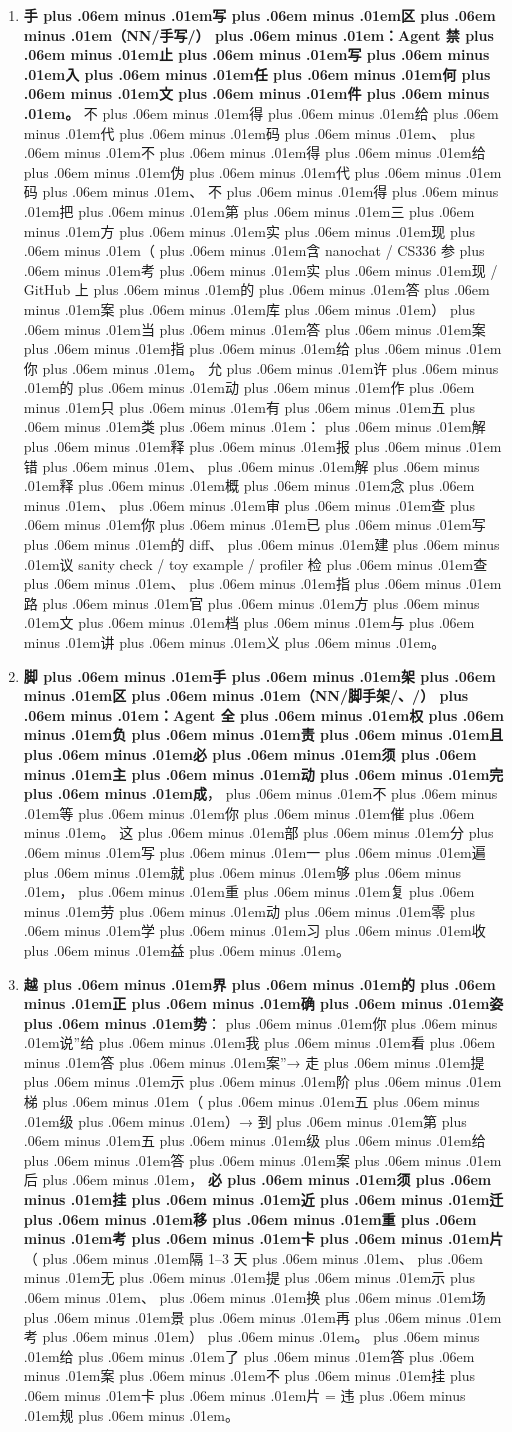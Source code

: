 \documentclass[
]{article}
\newcommand{\passthrough}[1]{#1}
\providecommand{\tightlist}{%
  \setlength{\itemsep}{0pt}\setlength{\parskip}{0pt}}
\def\zh#1{{\zhfont #1}}
\def\sym#1{{\symfont #1}}
\def\codezh#1{{\zhmonofont #1}}
\def\zhglue{\hskip0pt plus .06em minus .01em}
\begin{document}
\begin{enumerate}
\def\labelenumi{\arabic{enumi}.}
\tightlist
\item
  \textbf{\zh{手\zhglue 写\zhglue 区\zhglue （}\passthrough{\codezh{{\zh{课}}{\zh{题}}NN/{\zh{手}}{\zh{写}}/}}\zh{）\zhglue ：}Agent \zh{禁\zhglue 止\zhglue 写\zhglue 入\zhglue 任\zhglue 何\zhglue 文\zhglue 件\zhglue 。}} \zh{不\zhglue 得\zhglue 给\zhglue 代\zhglue 码\zhglue 、\zhglue 不\zhglue 得\zhglue 给\zhglue 伪\zhglue 代\zhglue 码\zhglue 、} \zh{不\zhglue 得\zhglue 把\zhglue 第\zhglue 三\zhglue 方\zhglue 实\zhglue 现\zhglue （\zhglue 含} nanochat / CS336 \zh{参\zhglue 考\zhglue 实\zhglue 现} / GitHub \zh{上\zhglue 的\zhglue 答\zhglue 案\zhglue 库\zhglue ）\zhglue 当\zhglue 答\zhglue 案\zhglue 指\zhglue 给\zhglue 你\zhglue 。} \zh{允\zhglue 许\zhglue 的\zhglue 动\zhglue 作\zhglue 只\zhglue 有\zhglue 五\zhglue 类\zhglue ：\zhglue 解\zhglue 释\zhglue 报\zhglue 错\zhglue 、\zhglue 解\zhglue 释\zhglue 概\zhglue 念\zhglue 、\zhglue 审\zhglue 查\zhglue 你\zhglue 已\zhglue 写\zhglue 的} diff\zh{、\zhglue 建\zhglue 议} sanity check / toy example / profiler \zh{检\zhglue 查\zhglue 、\zhglue 指\zhglue 路\zhglue 官\zhglue 方\zhglue 文\zhglue 档\zhglue 与\zhglue 讲\zhglue 义\zhglue 。}
\item
  \textbf{\zh{脚\zhglue 手\zhglue 架\zhglue 区\zhglue （}\passthrough{\codezh{{\zh{课}}{\zh{题}}NN/{\zh{脚}}{\zh{手}}{\zh{架}}/}}\zh{、}\passthrough{\codezh{{\zh{环}}{\zh{境}}/}}\zh{）\zhglue ：}Agent \zh{全\zhglue 权\zhglue 负\zhglue 责\zhglue 且\zhglue 必\zhglue 须\zhglue 主\zhglue 动\zhglue 完\zhglue 成}}\zh{，\zhglue 不\zhglue 等\zhglue 你\zhglue 催\zhglue 。} \zh{这\zhglue 部\zhglue 分\zhglue 写\zhglue 一\zhglue 遍\zhglue 就\zhglue 够\zhglue ，\zhglue 重\zhglue 复\zhglue 劳\zhglue 动\zhglue 零\zhglue 学\zhglue 习\zhglue 收\zhglue 益\zhglue 。}
\item
  \textbf{\zh{越\zhglue 界\zhglue 的\zhglue 正\zhglue 确\zhglue 姿\zhglue 势}}\zh{：\zhglue 你\zhglue 说}''\zh{给\zhglue 我\zhglue 看\zhglue 答\zhglue 案}''\sym{→} \zh{走\zhglue 提\zhglue 示\zhglue 阶\zhglue 梯\zhglue （\zhglue 五\zhglue 级\zhglue ）}\sym{→} \zh{到\zhglue 第\zhglue 五\zhglue 级\zhglue 给\zhglue 答\zhglue 案\zhglue 后\zhglue ，} \textbf{\zh{必\zhglue 须\zhglue 挂\zhglue 近\zhglue 迁\zhglue 移\zhglue 重\zhglue 考\zhglue 卡\zhglue 片}}\zh{（\zhglue 隔} 1--3 \zh{天\zhglue 、\zhglue 无\zhglue 提\zhglue 示\zhglue 、\zhglue 换\zhglue 场\zhglue 景\zhglue 再\zhglue 考\zhglue ）\zhglue 。\zhglue 给\zhglue 了\zhglue 答\zhglue 案\zhglue 不\zhglue 挂\zhglue 卡\zhglue 片} = \zh{违\zhglue 规\zhglue 。}
\end{enumerate}
\end{document}
